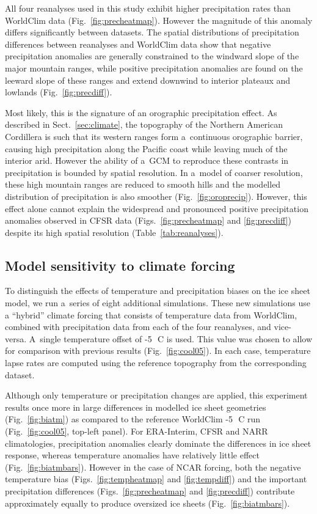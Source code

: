 \documentclass[tc, ms]{copernicus}
\begin{document}
All four reanalyses used in this study exhibit higher precipitation rates than WorldClim data (Fig.~\ref{fig:precheatmap}). However the magnitude of this anomaly differs significantly between datasets. The spatial distributions of precipitation differences between reanalyses and WorldClim data show that negative precipitation anomalies are generally constrained to the windward slope of the major mountain ranges, while positive precipitation anomalies are found on the leeward slope of these ranges and extend downwind to interior plateaux and lowlands (Fig.~\ref{fig:precdiff}).

Most likely, this is the signature of an orographic precipitation effect. As described in Sect.~\ref{sec:climate}, the topography of the Northern American Cordillera is such that its western ranges form a~continuous orographic barrier, causing high precipitation along the Pacific coast while leaving much of the interior arid. However the ability of a~GCM to reproduce these contrasts in precipitation is bounded by spatial resolution. In a~model of coarser resolution, these high mountain ranges are reduced to smooth hills and the modelled distribution of precipitation is also smoother (Fig.~\ref{fig:oroprecip}). However, this effect alone cannot explain the widespread and pronounced positive precipitation anomalies observed in CFSR data (Figs.~\ref{fig:precheatmap} and \ref{fig:precdiff}) despite its high spatial resolution (Table~\ref{tab:reanalyses}).

\subsection{Model sensitivity to climate forcing}

To distinguish the effects of temperature and precipitation biases on the ice sheet model, we run a~series of eight additional simulations. These new simulations use a ``hybrid'' climate forcing that consists of temperature data from WorldClim, combined with precipitation data from each of the four reanalyses, and vice-versa. A~single temperature offset of -5\,\unit{{\degree}C} is used. This value was chosen to allow for comparison with previous results (Fig.~\ref{fig:cool05}). In each case, temperature lapse rates are computed using the reference topography from the corresponding dataset.

Although only temperature or precipitation changes are applied, this experiment results once more in large differences in modelled ice sheet geometries (Fig.~\ref{fig:biatm}) as compared to the reference WorldClim -5\,\unit{{\degree}C} run (Fig.~\ref{fig:cool05}, top-left panel). For ERA-Interim, CFSR and NARR climatologies, precipitation anomalies clearly dominate the differences in ice sheet response, whereas temperature anomalies have relatively little effect (Fig.~\ref{fig:biatmbars}). However in the case of NCAR forcing, both the negative temperature bias (Figs.~\ref{fig:tempheatmap} and \ref{fig:tempdiff}) and the important precipitation differences (Figs.~\ref{fig:precheatmap} and \ref{fig:precdiff}) contribute approximately equally to produce oversized ice sheets (Fig.~\ref{fig:biatmbars}).
\end{document}
